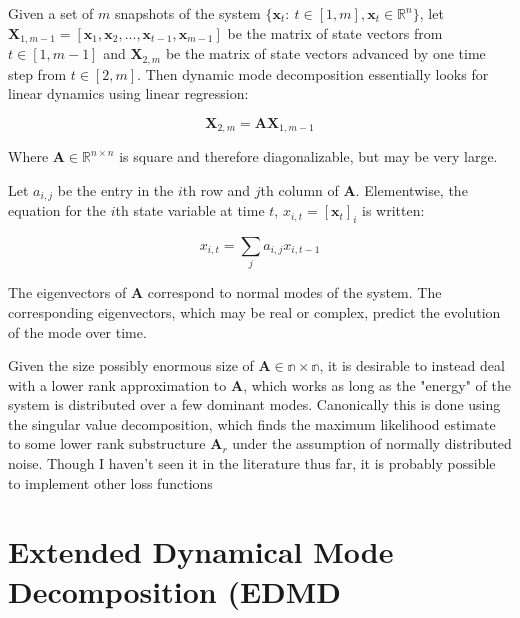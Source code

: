 Given a set of $m$ snapshots of the system $\{\mathbf{x}_t:\ t\in[1,m], \mathbf{x}_t \in \mathbb{R}^{n}\}$, let $\mathbf{X}_{1,m-1} = \left[\mathbf{x}_1,\mathbf{x}_2,...,\mathbf{x}_{t-1},\mathbf{x}_{m-1}\right]$ be the matrix of state vectors from $t\in[1,m-1]$ and $\mathbf{X}_{2,m}$ be the matrix of state vectors advanced by one time step from $t\in[2,m]$. Then dynamic mode decomposition essentially looks for linear dynamics using linear regression:

\begin{equation}
\mathbf{X}_{2,m} = \mathbf{A}\mathbf{X}_{1,m-1}
\end{equation}

Where $\mathbf{A} \in \mathbb{R}^{n\times n}$ is square and therefore diagonalizable, but may be very large.

Let $a_{i,j}$ be the entry in the $i$th row and $j$th column of $\mathbf{A}$. Elementwise, the equation for the $i$th state variable at time $t$, $x_{i,t} = [\mathbf{x}_t]_i$ is written:

\begin{equation}
x_{i,t} = \sum_j a_{i,j} x_{i,t-1}
\end{equation}

The eigenvectors of $\mathbf{A}$  correspond to normal modes of the system. The corresponding eigenvectors, which may be real or complex, predict the evolution of the mode over time.

Given the size possibly enormous size of $\mathbf{A}\in\mathbb{n\times n}$, it is desirable to instead deal with a lower rank approximation to $\mathbf{A}$, which works as long as the "energy" of the system is distributed over a few dominant modes. Canonically this is done using the singular value decomposition, which finds the maximum likelihood estimate to some lower rank substructure $\mathbf{A}_r$ under the assumption of normally distributed noise. Though I haven't seen it in the literature thus far, it is probably possible to implement other loss functions 

\section{Extended Dynamical Mode Decomposition (EDMD}
\label{sec:edmd}

